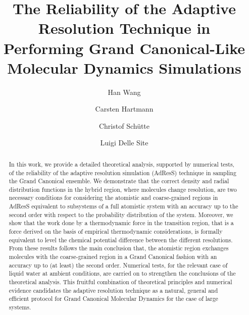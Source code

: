 \documentclass[aip,jcp,a4paper,reprint,onecolumn]{revtex4-1}
\begin{document}
\title{The Reliability of the Adaptive Resolution Technique in Performing  Grand Canonical-Like Molecular Dynamics Simulations}
\author{Han Wang}
\author{Carsten Hartmann}
\author{Christof Sch\"utte}
\author{Luigi Delle Site}

\begin{abstract}
  In this work, we provide a detailed theoretical analysis, supported by numerical tests, of the
  reliability of the adaptive resolution simulation (AdResS) technique in sampling the Grand Canonical
  ensemble. We demonstrate that the correct density and radial distribution
  functions in the hybrid region, where molecules change resolution, are two necessary conditions for
  considering the atomistic and coarse-grained regions in AdResS equivalent to subsystems
  of a full atomistic system with an accuracy up to the second order with respect to the probability distribution of the system. Moreover, we show that the
  work done by a thermodynamic force in the transition region, that is a force derived on the basis of empirical thermodynamic considerations, is formally equivalent to level the chemical
  potential difference between the different resolutions. From these results follows the main conclusion that, the atomistic region exchanges
  molecules with the coarse-grained region in a Grand Canonical
  fashion with an accuracy up to (at least) the second order. Numerical tests, for the relevant case of liquid water at ambient conditions, are carried on to strengthen the conclusions of the theoretical analysis.
  This fruitful combination of theoretical principles and numerical evidence candidates the adaptive resolution technique as a natural, general and efficient protocol for Grand Canonical Molecular Dynamics for the case of large systems.
\end{abstract}

\maketitle
\end{document}
